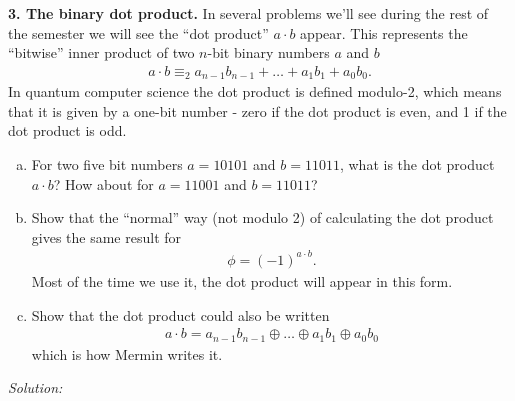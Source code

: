 \documentclass{book}
\theoremstyle{definition}
\begin{document}
\newpage



\noindent \textbf{3. The binary dot product.} In several problems we’ll see during the rest of the semester we
will see the ``dot product'' $a \cdot b$ appear. This represents the ``bitwise'' inner product of two $n$-bit binary numbers $a$ and $b$
\begin{align}
a\cdot b \equiv_2 a_{n-1}b_{n-1} + \dots + a_1b_1 + a_0b_0 .
\end{align}
In quantum computer science the dot product is defined modulo-2, which means that it is given by a one-bit number - zero if the dot product is even, and 1 if the dot product is odd.
\begin{enumerate}[(a)]
	\item For two five bit numbers $a = 10101$ and $b = 11011$, what is the dot product $a \cdot b$? How about for $a = 11001$ and $b = 11011$?
	
	\item Show that the ``normal'' way (not modulo 2) of calculating the dot product gives the same result for
	\begin{align}
	\phi = (-1)^{a\cdot b}.
	\end{align}
	Most of the time we use it, the dot product will appear in this form.
	
	
	\item Show that the dot product could also be written
	\begin{align}
	a\cdot b = a_{n-1}b_{n-1} \oplus\dots \oplus a_1b_1 \oplus a_0b_0
	\end{align}
	which is how Mermin writes it.
\end{enumerate}








\noindent \textit{Solution:}
\end{document}

